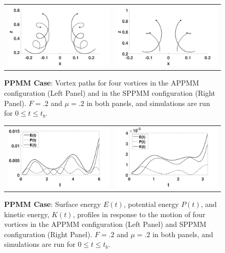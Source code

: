 \documentclass[a4paper,11pt]{article}
\begin{document}
%
\begin{figure}[!h]
\centering
\begin{tabular}{cc}
\includegraphics[width=.5\textwidth]{tracks_F_pt2_tf_6_ppmm} & 
\includegraphics[width=.5\textwidth]{tracks_F_pt2_tf_3pt2_ppmm_sym}
\end{tabular}
\caption{\small {\bf PPMM Case}: Vortex paths for four vortices in the APPMM configuration  (Left Panel) and in the SPPMM configuration (Right Panel). $F=.2$ and $\mu=.2$ in both panels, and simulations are run for $0\leq t \leq t_{b}$.}
\label{fig:tracksppmm}
\end{figure}
%
\begin{figure}[!h]
\centering
\begin{tabular}{cc}
\includegraphics[width=.5\textwidth]{energy_profile_mu_pt2_F_pt2_ppmm} &
\includegraphics[width=.5\textwidth]{energy_profile_mu_pt2_F_pt2_ppmm_sym}
\end{tabular}
\caption{\small {\bf PPMM Case}:  Surface energy $E(t)$, potential energy $P(t)$, and kinetic energy, $K(t)$, profiles in response to the motion of four vortices in the APPMM configuration (Left Panel) and SPPMM configuration (Right Panel).  $F=.2$ and $\mu=.2$ in both panels, and simulations are run for $0\leq t \leq t_{b}$.}
\label{fig:eprof_ppmm}
\end{figure}
\end{document}
